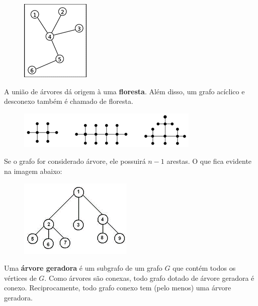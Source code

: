 \documentclass{article}
\begin{document}
\begin{figure}[H]
	\centering
	\includegraphics[width=0.3\linewidth]{"Figuras/IMG1"}
	\label{fig:img1}
	\caption{}
\end{figure}

	A união de árvores dá origem à uma \textbf{floresta}. Além disso, um grafo acíclico e desconexo também é chamado de floresta.
		
\begin{figure}[H]
	\centering
	\includegraphics[width=0.8\linewidth]{"Figuras/IMG2"}
	\label{fig:img2}
	\caption{}
\end{figure}\vspace*{0.3cm}
	Se o grafo for considerado árvore, ele possuirá $n-1$ arestas. O que fica evidente na imagem abaixo:
	
\begin{figure}[H]
	\centering
	\includegraphics[width=0.5\linewidth]{"Figuras/IMG3"}
	\label{fig:img3}
	\caption{}
\end{figure}\vspace*{0.2cm}
	\newpage
	
	Uma \textbf{árvore geradora} é um subgrafo de um grafo $G$ que contém todos os vértices de $G$. Como árvores são conexas, todo grafo dotado de árvore geradora é conexo.  Reciprocamente, todo grafo conexo tem (pelo menos) uma árvore geradora.  
\end{document}
